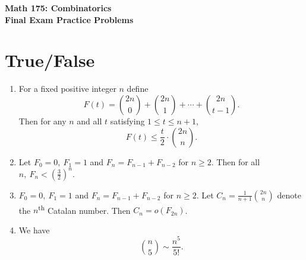 \documentclass[11pt]{article}
\begin{document}
\begin{center}
{\Large \bf Math 175: Combinatorics} \\
{\large \bf Final Exam Practice Problems}
\end{center}

\section{True/False}

\begin{enumerate}






\item For a fixed positive integer $n$ define
\[
F(t) = \binom{2n}{0} + \binom{2n}{1} + \cdots + \binom{2n}{t-1}.
\]
Then for any $n$ and all $t$ satisfying $1 \le t \le n+1$,
\[
F(t) \le \frac{t}{2} \cdot \binom{2n}{n}.
\]




\item Let $F_0 = 0,\ F_1 = 1$ and $F_n = F_{n-1}+F_{n-2}$ for $n\ge 2$.  Then for all $n,\ F_n < \left(\frac{3}{2}\right)^n$.




\item $F_0 = 0,\ F_1 = 1$ and $F_n = F_{n-1}+F_{n-2}$ for $n\ge 2$.  Let $C_n = \frac{1}{n+1} \binom{2n}{n}$ denote the $n$\textsuperscript{th} Catalan number.  Then $C_n = o(F_{2n})$.

\item We have 
\[
\binom{n}{5} \sim \frac{n^{5}}{5!}.
\]


\end{enumerate}
\end{document}
